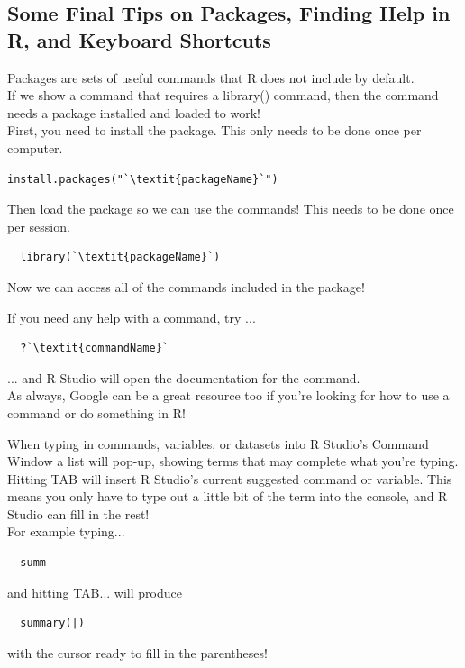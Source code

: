 \documentclass[12pt,letterpaper]{article}
\begin{document}
\subsection{Some Final Tips on Packages, Finding Help in R, and Keyboard Shortcuts}

\vspace{1em}

\begin{tcolorbox}[title = Packages]
Packages are sets of useful commands that R does not include by default. \\
If we show a command that requires a library() command, then the command needs a package installed and loaded to work!\vspace{1em}\\
First, you need to install the package. This only needs to be done once per computer.
\begin{lstlisting}[frameround = t t t t, backgroundcolor = \color{lightgray}]
  install.packages("`\textit{packageName}`")
\end{lstlisting}
Then load the package so we can use the commands! This needs to be done once per session.
\begin{lstlisting}
  library(`\textit{packageName}`)
\end{lstlisting}
Now we can access all of the commands included in the package!
\end{tcolorbox}

\begin{tcolorbox}[title = Help!]
If you need any help with a command, try ...
\begin{lstlisting}
  ?`\textit{commandName}`
\end{lstlisting}
... and R Studio will open the documentation for the command.
\\
As always, Google can be a great resource too if you're looking for how to use a command or do something in R!
\end{tcolorbox}

\begin{tcolorbox}[title = Shortcuts!]
When typing in commands, variables, or datasets into R Studio's Command Window a list will pop-up, showing terms that may complete what you're typing. Hitting TAB will insert R Studio's current suggested command or variable. This means you only have to type out a little bit of the term into the console, and R Studio can fill in the rest!\\
For example typing...
\begin{lstlisting}
  summ
\end{lstlisting}
and hitting TAB... will produce
\begin{lstlisting}
  summary(|)
\end{lstlisting}
with the cursor ready to fill in the parentheses!
\end{tcolorbox}
\end{document}
